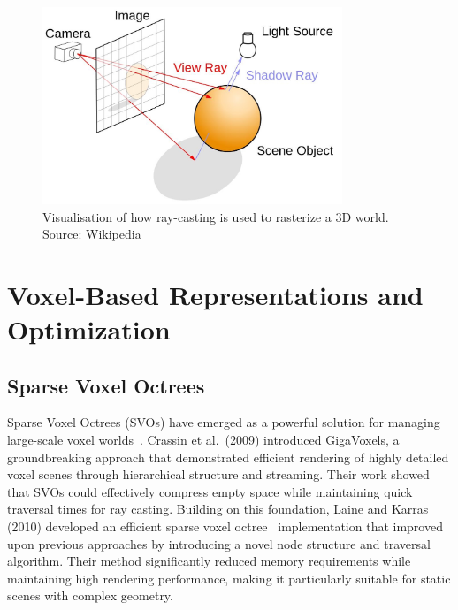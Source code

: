 \begin{figure}[thp]
    \caption{Visualisation of how ray-casting is used to rasterize a 3D world. Source: Wikipedia}
    \begin{center}
        \includegraphics[width=0.8\textwidth]{figures/ray_tracing.jpg}
    \end{center}
\end{figure}

\section{Voxel-Based Representations and Optimization}

\subsection{Sparse Voxel Octrees}
Sparse Voxel Octrees (SVOs) have emerged as a powerful solution for managing large-scale voxel
worlds~\cite{crassin2009gigavoxels}. Crassin et al.\ (2009) introduced GigaVoxels, a groundbreaking approach that
demonstrated efficient rendering of highly detailed voxel scenes through hierarchical structure and streaming. Their
work showed that SVOs could effectively compress empty space while maintaining quick traversal times for ray casting.
Building on this foundation, Laine and Karras (2010) developed an efficient sparse voxel octree~\cite{laine2010efficient}
implementation that improved upon previous approaches by introducing a novel node structure and traversal algorithm.
Their method significantly reduced memory requirements while maintaining high rendering performance, making it
particularly suitable for static scenes with complex geometry.

